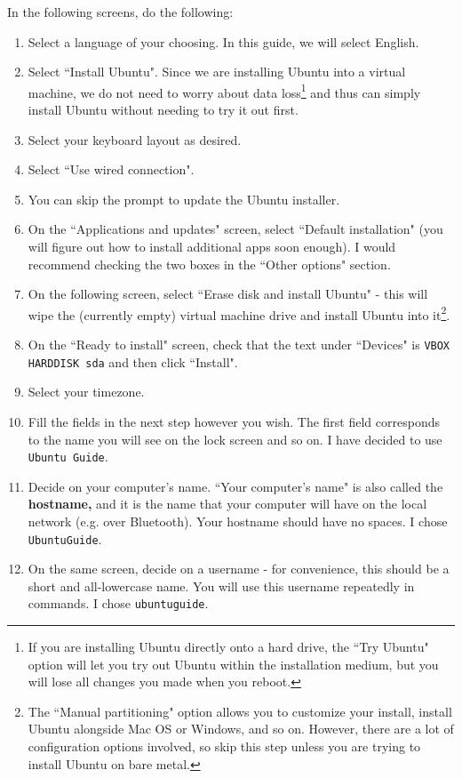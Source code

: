 \documentclass[12pt]{article}
\begin{document}
In the following screens, do the following:
\begin{enumerate}
    \item Select a language of your choosing. In this guide, we will select English.
    \item Select ``Install Ubuntu". Since we are installing Ubuntu into a virtual machine, we do not need to worry about data loss\footnote{If you are installing Ubuntu directly onto a hard drive, the ``Try Ubuntu" option will let you try out Ubuntu within the installation medium, but you will lose all changes you made when you reboot.} and thus can simply install Ubuntu without needing to try it out first. 
    \item Select your keyboard layout as desired.
    \item Select ``Use wired connection".
    \item You can skip the prompt to update the Ubuntu installer.
    \item On the ``Applications and updates" screen, select ``Default installation" (you will figure out how to install additional apps soon enough). I would recommend checking the two boxes in the ``Other options" section.
    \item On the following screen, select ``Erase disk and install Ubuntu" - this will wipe the (currently empty) virtual machine drive and install Ubuntu into it\footnote{The ``Manual partitioning" option allows you to customize your install, install Ubuntu alongside Mac OS or Windows, and so on. However, there are a lot of configuration options involved, so skip this step unless you are trying to install Ubuntu on bare metal.}.
    \item On the ``Ready to install" screen, check that the text under ``Devices" is \verb|VBOX HARDDISK sda| and then click ``Install". 
    \item Select your timezone.
    \item Fill the fields in the next step however you wish. The first field corresponds to the name you will see on the lock screen and so on. I have decided to use \verb|Ubuntu Guide|. 
    \item Decide on your computer's name. ``Your computer's name" is also called the \textbf{hostname,} and it is the name that your computer will have on the local network (e.g. over Bluetooth). Your hostname should have no spaces. I chose \verb|UbuntuGuide|.
    \item On the same screen, decide on a username - for convenience, this should be a short and all-lowercase name. You will use this username repeatedly in commands. I chose \verb|ubuntuguide|.

\end{enumerate}
\end{document}

